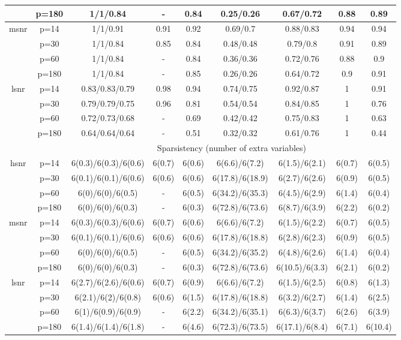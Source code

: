 \begin{table}[ht]
{\begin{tabular}{|c|c|ccccccc|}
   & p=180 & 1/1/0.84 & - & 0.84 & 0.25/0.26 & 0.67/0.72 & 0.88 & 0.89 \\ 
  \midrule\multirow{4}[2]{*}{msnr} & p=14 & 1/1/0.91 & 0.91 & 0.92 & 0.69/0.7 & 0.88/0.83 & 0.94 & 0.94 \\ 
   & p=30 & 1/1/0.84 & 0.85 & 0.84 & 0.48/0.48 & 0.79/0.8 & 0.91 & 0.89 \\ 
   & p=60 & 1/1/0.84 & - & 0.84 & 0.36/0.36 & 0.72/0.76 & 0.88 & 0.9 \\ 
   & p=180 & 1/1/0.84 & - & 0.85 & 0.26/0.26 & 0.64/0.72 & 0.9 & 0.91 \\ 
  \midrule\multirow{4}[2]{*}{lsnr} & p=14 & 0.83/0.83/0.79 & 0.98 & 0.94 & 0.74/0.75 & 0.92/0.87 & 1 & 0.91 \\ 
   & p=30 & 0.79/0.79/0.75 & 0.96 & 0.81 & 0.54/0.54 & 0.84/0.85 & 1 & 0.76 \\ 
   & p=60 & 0.72/0.73/0.68 & - & 0.69 & 0.42/0.42 & 0.75/0.83 & 1 & 0.63 \\ 
   & p=180 & 0.64/0.64/0.64 & - & 0.51 & 0.32/0.32 & 0.61/0.76 & 1 & 0.44 \\ 
   \midrule 
 \multicolumn{1}{|c}{} &       & \multicolumn{7}{c|}{Sparsistency (number of extra variables)} \\
\midrule\multirow{4}[2]{*}{hsnr} & p=14 & 6(0.3)/6(0.3)/6(0.6) & 6(0.7) & 6(0.6) & 6(6.6)/6(7.2) & 6(1.5)/6(2.1) & 6(0.7) & 6(0.5) \\ 
   & p=30 & 6(0.1)/6(0.1)/6(0.6) & 6(0.6) & 6(0.6) & 6(17.8)/6(18.9) & 6(2.7)/6(2.6) & 6(0.9) & 6(0.5) \\ 
   & p=60 & 6(0)/6(0)/6(0.5) & - & 6(0.5) & 6(34.2)/6(35.3) & 6(4.5)/6(2.9) & 6(1.4) & 6(0.4) \\ 
   & p=180 & 6(0)/6(0)/6(0.3) & - & 6(0.3) & 6(72.8)/6(73.6) & 6(8.7)/6(3.9) & 6(2.2) & 6(0.2) \\ 
  \midrule\multirow{4}[2]{*}{msnr} & p=14 & 6(0.3)/6(0.3)/6(0.6) & 6(0.7) & 6(0.6) & 6(6.6)/6(7.2) & 6(1.5)/6(2.2) & 6(0.7) & 6(0.5) \\ 
   & p=30 & 6(0.1)/6(0.1)/6(0.6) & 6(0.6) & 6(0.6) & 6(17.8)/6(18.8) & 6(2.8)/6(2.3) & 6(0.9) & 6(0.5) \\ 
   & p=60 & 6(0)/6(0)/6(0.5) & - & 6(0.5) & 6(34.2)/6(35.2) & 6(4.8)/6(2.6) & 6(1.4) & 6(0.4) \\ 
   & p=180 & 6(0)/6(0)/6(0.3) & - & 6(0.3) & 6(72.8)/6(73.6) & 6(10.5)/6(3.3) & 6(2.1) & 6(0.2) \\ 
  \midrule\multirow{4}[2]{*}{lsnr} & p=14 & 6(2.7)/6(2.6)/6(0.6) & 6(0.7) & 6(0.9) & 6(6.6)/6(7.2) & 6(1.5)/6(2.5) & 6(0.8) & 6(1.3) \\ 
   & p=30 & 6(2.1)/6(2)/6(0.8) & 6(0.6) & 6(1.5) & 6(17.8)/6(18.8) & 6(3.2)/6(2.7) & 6(1.4) & 6(2.5) \\ 
   & p=60 & 6(1)/6(0.9)/6(0.9) & - & 6(2.2) & 6(34.2)/6(35.1) & 6(6.3)/6(3.7) & 6(2.6) & 6(3.9) \\ 
   & p=180 & 6(1.4)/6(1.4)/6(1.8) & - & 6(4.6) & 6(72.3)/6(73.5) & 6(17.1)/6(8.4) & 6(7.1) & 6(10.4) \\ 
   \bottomrule 
\end{tabular}
}
\end{table}
